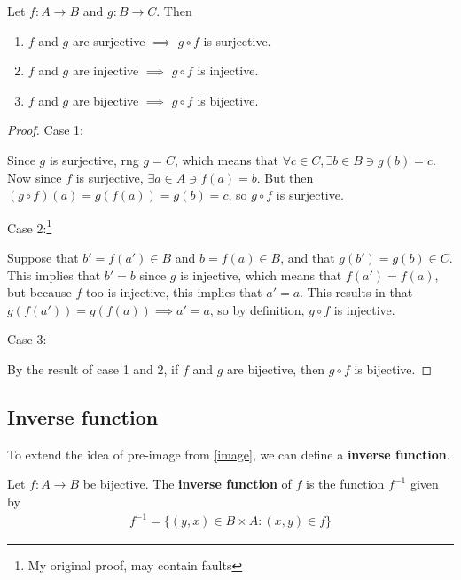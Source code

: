 \begin{theorem}
	Let $f:A\rightarrow B$ and $g:B\rightarrow C$. Then
	\begin{enumerate}
		\item $f$ and $g$ are surjective $\implies$ $g \circ f$ is surjective.
		\item $f$ and $g$ are injective $\implies$ $g \circ f$ is injective.
		\item $f$ and $g$ are bijective $\implies$ $g \circ f$ is bijective.
	\end{enumerate}
\end{theorem}

\begin{proof}
	Case 1:
	
	Since $g$ is surjective, rng $g=C$, which means that $\forall c\in C, \exists b\in B \ni g(b)=c$. Now since $f$ is surjective, $\exists a\in A \ni f(a)=b$. But then $(g\circ f)(a)=g(f(a))=g(b)=c$, so $g\circ f$ is surjective. \bigskip
	
	Case 2:\footnote{My original proof, may contain faults}
	
	Suppose that $b'=f(a')\in B$ and $b=f(a)\in B$, and that $g(b')=g(b)\in C$. This implies that $b'=b$ since $g$ is injective, which means that $f(a')=f(a)$, but because $f$ too is injective, this implies that $a'=a$. This results in that $g(f(a'))=g(f(a)) \implies a'=a$, so by definition, $g\circ f$ is injective.
	
	Case 3: 
	
	By the result of case 1 and 2, if $f$ and $g$ are bijective, then $g \circ f$ is bijective.
\end{proof}

\newpage
\subsection{Inverse function}

To extend the idea of pre-image from \ref{image}, we can define a \textbf{inverse function}.

\begin{definition}
	Let $f:A\rightarrow B$ be bijective. The \textbf{inverse function} of $f$ is the function $f^{-1}$ given by
	\begin{align*}
		f^{-1} = \{(y,x)\in B\times A: (x,y)\in f\}
 	\end{align*} 
\end{definition}

